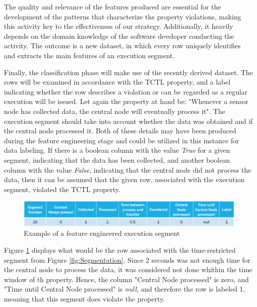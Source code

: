 The quality and relevance of the features produced are essential for the development of the patterns that characterize the property violations, making this activity key to the effectiveness of our strategy. Additionally, it heavily depends on the domain knowledge of the software developer conducting the activity. The outcome is a new dataset, in which every row uniquely identifies and extracts the main features of an execution segment.

Finally, the classification phase will make use of the recently derived dataset. The rows will be examined in accordance with the TCTL property, and a label indicating whether the row describes a violation or can be regarded as a regular execution will be issued. Let again the property at hand be: "Whenever a sensor node has collected data, the central node will eventually process it". The execution segment should take into account whether the data was obtained and if the central node processed it. Both of these details may have been produced during the feature engineering stage and could be utilized in this instance for data labeling. If there is a boolean column with the value \textit{True} for a given segment, indicating that the data has been collected, and another boolean column with the value \textit{False}, indicating that the central node did not process the data, then it can be assumed that the given row, associated with the execution segment, violated the TCTL property.

\begin{figure}[!h]
	\centering
	\includegraphics[width=0.999\textwidth, keepaspectratio]{img/FeatureEngResult.png}
	\caption{Example of a feature engineered execution segment}
	\label{fig:FeatureEngResult}
\end{figure}

Figure \ref{fig:FeatureEngResult} displays what would be the row associated with the time-restricted segment from Figure \ref{fig:Segmentation}. Since 2 seconds was not enough time for the central node to process the data, it was considered not done whithin the time window of th property. Hence, the column "Central Node processed" is zero, and "Time until Central Node processed" is \textit{null}, and therefore the row is labeled 1, meaning that this segment does violate the property.


